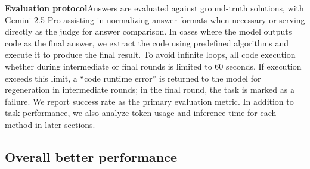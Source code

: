 \textbf{Evaluation protocol}\quad Answers are evaluated against ground-truth solutions, with Gemini-2.5-Pro assisting in normalizing answer formats when necessary or serving directly as the judge for answer comparison. In cases where the model outputs code as the final answer, we extract the code using predefined algorithms and execute it to produce the final result. To avoid infinite loops, all code execution whether during intermediate or final rounds is limited to 60 seconds. If execution exceeds this limit, a ``code runtime error'' is returned to the model for regeneration in intermediate rounds; in the final round, the task is marked as a failure. We report success rate as the primary evaluation metric. In addition to task performance, we also analyze token usage and inference time for each method in later sections.

\subsection{Overall better performance}

